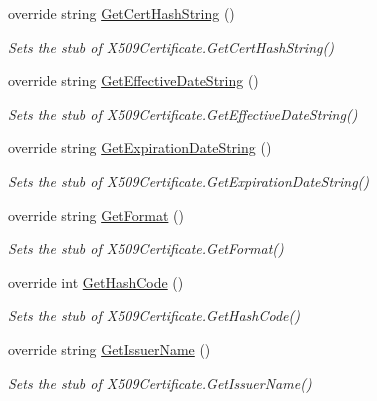 \begin{DoxyCompactItemize}
override string \hyperlink{class_system_1_1_security_1_1_cryptography_1_1_x509_certificates_1_1_fakes_1_1_stub_x509_certificate_a160fb5d237fd69327b9ca26ed97a1b54}{Get\-Cert\-Hash\-String} ()
\begin{DoxyCompactList}\small\item\em Sets the stub of X509\-Certificate.\-Get\-Cert\-Hash\-String()\end{DoxyCompactList}\item 
override string \hyperlink{class_system_1_1_security_1_1_cryptography_1_1_x509_certificates_1_1_fakes_1_1_stub_x509_certificate_af13abaeccae30b0a46c0c742718b7ff6}{Get\-Effective\-Date\-String} ()
\begin{DoxyCompactList}\small\item\em Sets the stub of X509\-Certificate.\-Get\-Effective\-Date\-String()\end{DoxyCompactList}\item 
override string \hyperlink{class_system_1_1_security_1_1_cryptography_1_1_x509_certificates_1_1_fakes_1_1_stub_x509_certificate_a472ffc753cba1c8e6176db096a20150b}{Get\-Expiration\-Date\-String} ()
\begin{DoxyCompactList}\small\item\em Sets the stub of X509\-Certificate.\-Get\-Expiration\-Date\-String()\end{DoxyCompactList}\item 
override string \hyperlink{class_system_1_1_security_1_1_cryptography_1_1_x509_certificates_1_1_fakes_1_1_stub_x509_certificate_ab232f9fb93aab80a7a8a7ba40a1c26cd}{Get\-Format} ()
\begin{DoxyCompactList}\small\item\em Sets the stub of X509\-Certificate.\-Get\-Format()\end{DoxyCompactList}\item 
override int \hyperlink{class_system_1_1_security_1_1_cryptography_1_1_x509_certificates_1_1_fakes_1_1_stub_x509_certificate_ab913b847280e153501b48c77010ef580}{Get\-Hash\-Code} ()
\begin{DoxyCompactList}\small\item\em Sets the stub of X509\-Certificate.\-Get\-Hash\-Code()\end{DoxyCompactList}\item 
override string \hyperlink{class_system_1_1_security_1_1_cryptography_1_1_x509_certificates_1_1_fakes_1_1_stub_x509_certificate_ad69a1eb09e62c57e716958bbca0c2179}{Get\-Issuer\-Name} ()
\begin{DoxyCompactList}\small\item\em Sets the stub of X509\-Certificate.\-Get\-Issuer\-Name()\end{DoxyCompactList}\item 

\end{DoxyCompactItemize}
